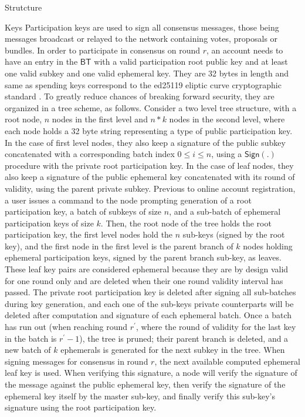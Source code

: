 \documentclass[10pt,a4paper]{article}
\begin{document}
\begin{section}{Strutcture}
\begin{subsection}{Keys}
    Participation keys are used to sign all consensus messages, those being messages broadcast or relayed
    to the network containing votes, proposals or bundles.
    In order to participate in consensus on round $r$, an account needs to have an entry in the $\mathsf{BT}$ 
    with a valid participation root public key and at least one valid subkey and one valid ephemeral key.
    They are 32 bytes in length and same as spending keys correspond to the ed25119 eliptic curve cryptographic standard 
    .
    To greatly reduce chances of breaking forward security, they are organized in a tree scheme, as follows.
    Consider a two level tree structure, with a root node, $n$ nodes in the first level and $n*k$ nodes in the
    second level, where each node holds a 32 byte string representing a type of public participation key. 
    In the case of first level nodes, they also keep a signature of the public subkey concatenated with a corresponding batch index $0 \leq i \leq n$,
    using a $\mathsf{Sign}(.)$ procedure with the private root participation key.
    In the case of leaf nodes, they also keep a signature of the public ephemeral key concatenated with its round of validity,
    using the parent private subkey.
    Previous to online account registration, a user issues a command to the node prompting generation of a root 
    participation key, a batch of subkeys of size $n$, and a sub-batch of ephemeral participation keys of size $k$.
    Then, the root node of the tree holds the root participation key, the first level nodes hold the $n$ sub-keys
    (signed by the root key), and the first node in the first level is the parent branch of $k$ nodes holding
    ephemeral participation keys, signed by the parent branch sub-key, as leaves.
    These leaf key pairs are considered ephemeral because they are by design valid for one round only and are deleted when their
    one round validity interval has passed.
    The private root participation key is deleted after signing all sub-batches during key generation,
    and each one of the sub-keys private counterparts will be deleted after computation and signature of each ephemeral batch.
    Once a batch has run out (when reaching round $r^\prime$, where the round of validity for the last key in the batch
    is $r^\prime - 1$), the tree is pruned; their parent branch is deleted, and a new batch of $k$ ephemerals
    is generated for the next subkey in the tree.
    When signing messages for consensus in round $r$, the next available computed ephemeral leaf key is used.
    When verifying this signature, a node will verify the signature of the message against the public ephemeral key, 
    then verify the signature of the ephemeral key itself by the master sub-key, and finally verify this sub-key's
    signature using the root participation key.


\end{subsection}
\end{section}
\end{document}
